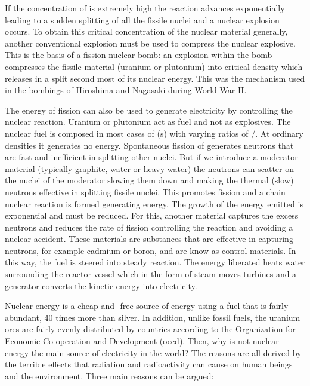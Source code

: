 If the concentration of \ufis is extremely high the reaction advances exponentially leading
to a sudden splitting of all the fissile nuclei and a nuclear explosion occurs. To obtain 
this critical concentration of the nuclear material generally, another conventional explosion 
must be used to compress the nuclear explosive. This is the basis of a fission nuclear bomb: 
an explosion within the bomb compresses the fissile material (uranium or plutonium) into 
critical density which releases in a split second most of its nuclear energy. This was the 
mechanism used in the bombings of Hiroshima and Nagasaki during World War II. 

The energy of fission can also be used to generate electricity by controlling the 
nuclear reaction. Uranium or plutonium act as fuel and not as explosives. The nuclear fuel is 
composed in most cases of (s) with varying ratios of \ufis/\unofis. At ordinary 
densities it generates no energy. Spontaneous fission of \ufis generates 
neutrons that are fast and inefficient in splitting other nuclei. But if we introduce a 
moderator material (typically graphite, water or heavy water) the neutrons can scatter on the 
nuclei of the moderator slowing them down and making the thermal (slow) neutrons effective in 
splitting fissile 
nuclei. This promotes fission and a chain nuclear reaction is formed generating energy. The 
growth of the energy emitted is exponential and must be reduced. For this, another material 
captures the excess neutrons and reduces the rate of fission controlling the reaction and 
avoiding a nuclear accident. These materials are substances that are effective in capturing 
neutrons, for example cadmium or boron, and are know as control materials. In this way, the fuel is 
steered 
into steady reaction. The energy liberated heats water surrounding the reactor 
vessel which in the form of steam moves turbines and a generator converts the kinetic energy 
into electricity. 

Nuclear energy is a cheap and -free source of energy using a fuel that is 
fairly abundant, 40 times more than silver. In addition, unlike fossil fuels, the uranium 
ores are fairly evenly distributed by countries according to the Organization for Economic 
Co-operation and Development (\gls{oecd})\cite{UReserves}. Then, why is not nuclear energy the main 
source of electricity in the world? The reasons are all derived by the terrible effects that 
radiation and radioactivity can cause on human beings and the environment. Three main reasons 
can be argued: 

